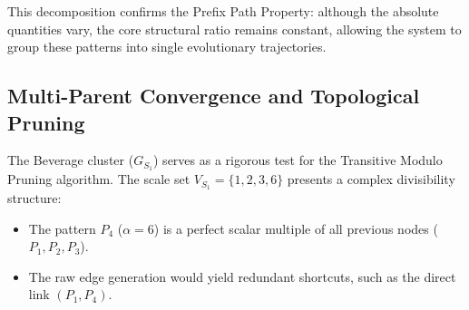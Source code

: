 \documentclass[10pt, twocolumn]{article}
\begin{document}
This decomposition confirms the Prefix Path Property: although the absolute
quantities vary, the core structural ratio remains constant, allowing the
system to group these patterns into single evolutionary trajectories.

\subsection{Multi-Parent Convergence and Topological Pruning}

The Beverage cluster ($G_{S_1}$) serves as a rigorous test for the Transitive
Modulo Pruning algorithm. The scale set $V_{S_1} = \{1,2,3,6\}$ presents a
complex divisibility structure:

\begin{itemize}
    \item The pattern $P_4$ ($\alpha = 6$) is a perfect scalar multiple of all
          previous nodes ($P_1, P_2, P_3$).
    \item The raw edge generation would yield redundant shortcuts, such as the
          direct link $(P_1, P_4)$.
\end{itemize}
\end{document}
